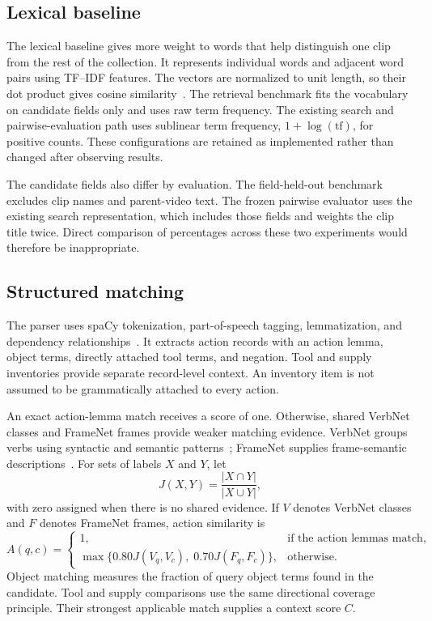 \documentclass[11pt,letterpaper]{article}
\begin{document}
\subsection{Lexical baseline}
The lexical baseline gives more weight to words that help distinguish one
clip from the rest of the collection. It represents individual words and
adjacent word pairs using TF--IDF features. The vectors are normalized to unit length, so their
dot product gives cosine similarity~\cite{sklearn}. The retrieval benchmark
fits the vocabulary on candidate fields only and uses raw term frequency.
The existing search and pairwise-evaluation path uses sublinear term
frequency, $1+\log(\mathrm{tf})$, for positive counts. These configurations
are retained as implemented rather than changed after observing results.

The candidate fields also differ by evaluation. The field-held-out benchmark
excludes clip names and parent-video text. The frozen pairwise evaluator uses
the existing search representation, which includes those fields and weights
the clip title twice. Direct comparison of percentages across these two
experiments would therefore be inappropriate.

\subsection{Structured matching}
The parser uses spaCy tokenization, part-of-speech tagging, lemmatization, and
dependency relationships~\cite{spacy}. It extracts action records with an
action lemma, object terms, directly attached tool terms, and negation.
Tool and supply inventories provide separate record-level context. An
inventory item is not assumed to be grammatically attached to every action.

An exact action-lemma match receives a score of one. Otherwise, shared
VerbNet classes and FrameNet frames provide weaker matching evidence.
VerbNet groups verbs using syntactic and semantic patterns~\cite{verbnet};
FrameNet supplies frame-semantic descriptions~\cite{baker1998framenet}.
For sets of labels $X$ and $Y$, let
\begin{equation}
 J(X,Y)=\frac{|X\cap Y|}{|X\cup Y|},
\end{equation}
with zero assigned when there is no shared evidence. If $V$ denotes VerbNet
classes and $F$ denotes FrameNet frames, action similarity is
\begin{equation}
 A(q,c)=
 \begin{cases}
  1, & \text{if the action lemmas match},\\
  \max\{0.80J(V_q,V_c),\;0.70J(F_q,F_c)\}, & \text{otherwise}.
 \end{cases}
\end{equation}
Object matching measures the fraction of query object terms found in the
candidate. Tool and supply comparisons use the same directional coverage
principle. Their strongest applicable match supplies a context score $C$.
\end{document}
